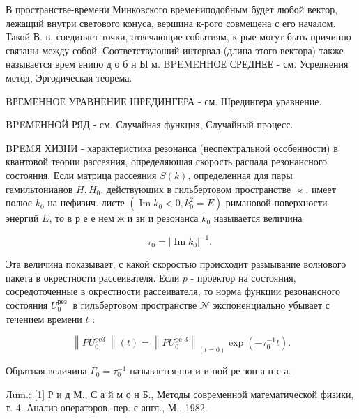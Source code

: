 \documentclass[10pt]{article}
\begin{document}
В пространстве-времени Минковского времениподобным будет любой вектор, лежащий внутри светового конуса, вершина к-рого совмещена с его началом. Такой В. в. соединяет точки, отвечающие событиям, к-рые могут быть причинно связаны между собой. Соответствуюший интервал (длина этого вектора) также называется врем енипо д о б н Ы м. BPEMEНHОЕ СРЕДНЕЕ - см. Усреднения метод, Эргодическая теорема.



BРЕМЕННОЕ УРАВНЕНИЕ ШРЕДИНГЕРА - см. Шредингера уравнение.



BPEМЕННОЙ РЯД - см. Случайная функция, Случайный процесс.



BPEMЯ ХИЗНИ - характеристика резонанса (неспектральной особенности) в квантовой теории рассеяния, определяюшая скорость распада резонансного состояния. Если матрица рассеяния $S(k)$, определенная для пары гамильтонианов $H, H_{0}$, действующих в гильбертовом пространстве $\mathscr{\varkappa}$, имеет полюс $k_{0}$ на нефизич. листе $\left(\operatorname{Im} k_{0}<0, k_{0}^{2}=E\right)$ римановой поверхности энергий $E$, то в р е е нем ж и зн и резонанса $k_{0}$ называется величина



\[

\tau_{0}=\left|\operatorname{Im} k_{0}\right|^{-1} \text {. }

\]



Эта величина показывает, с какой скоростью происходит размывание волнового пакета в окрестности рассеивателя. Если $p$ - проектор на состояния, сосредоточенные в окрестности рассеивателя, то норма функции резонансного состояния $U_{0}^{\text {рез }}$ в гильбертовом пространстве $\mathscr{N}$ экспоненциально убывает с течением времени $t$ :



\[

\left\|P U_{0}^{\text {pe3 }}\right\|(t)=\left\|P U_{0}^{\text {pe } 3}\right\|_{(t=0)} \exp \left(-\tau_{0}^{-1} t\right) .

\]



Обратная величина $\Gamma_{0}=\tau_{0}^{-1}$ называется ши и и ной ре зон а н с а.



Лum.: [1] Р и д М., С а й м о н Б., Методы современной математической физики, т. 4. Анализ операторов, пер. с англ., М., 1982.
\end{document}

